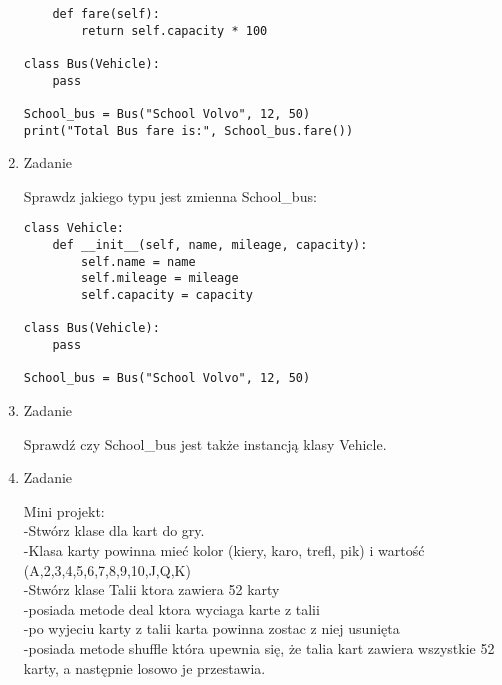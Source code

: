 \documentclass[11pt]{article}
\begin{document}
\begin{enumerate}
\begin{lstlisting}
	def fare(self):
		return self.capacity * 100

class Bus(Vehicle):
	pass

School_bus = Bus("School Volvo", 12, 50)
print("Total Bus fare is:", School_bus.fare())
\end{lstlisting}

\item 
\begin{Large}
	Zadanie
\end{Large}
\par
Sprawdz jakiego typu jest zmienna School\_bus:
\begin{lstlisting}
class Vehicle:
	def __init__(self, name, mileage, capacity):
		self.name = name
		self.mileage = mileage
		self.capacity = capacity
	
class Bus(Vehicle):
	pass
	
School_bus = Bus("School Volvo", 12, 50)
\end{lstlisting}

\item 
\begin{Large}
	Zadanie
\end{Large}
\par
Sprawdź czy School\_bus jest także instancją klasy Vehicle.

\item 
\begin{Large}
	Zadanie
\end{Large}
\par
Mini projekt:\\
-Stwórz klase dla kart do gry.\\
-Klasa karty powinna mieć kolor (kiery, karo, trefl, pik) i wartość (A,2,3,4,5,6,7,8,9,10,J,Q,K)\\
-Stwórz klase Talii ktora zawiera 52 karty\\
-posiada metode deal ktora wyciaga karte z talii\\
-po wyjeciu karty z talii karta powinna zostac z niej usunięta\\
-posiada metode shuffle która upewnia się, że talia kart zawiera wszystkie 52 karty, a następnie losowo je przestawia.\\
	
\end{enumerate}
\end{document}
